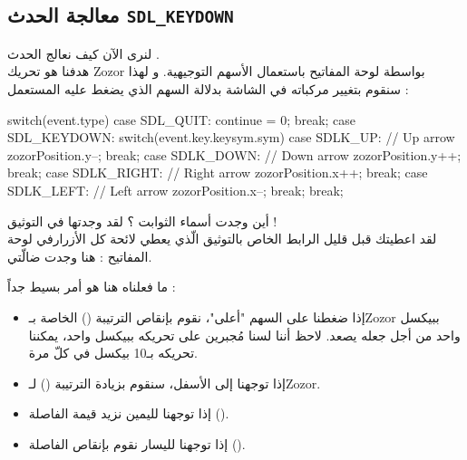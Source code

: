 \subsection{معالجة الحدث \texttt{SDL\_KEYDOWN}}

لنرى الآن كيف نعالج الحدث 
.\\
هدفنا هو تحريك 
\textenglish{Zozor}
بواسطة لوحة المفاتيح باستعمال الأسهم التوجيهية. و لهذا سنقوم بتغيير مركباته في الشاشة بدلالة السهم الذي يضغط عليه المستعمل :

\begin{Csource}
switch(event.type)
{
	case SDL_QUIT:
	continue = 0;
	break;
	case SDL_KEYDOWN:
	switch(event.key.keysym.sym)
	{
		case SDLK_UP: // Up arrow
		zozorPosition.y--;
		break;
		case SDLK_DOWN: // Down arrow
		zozorPosition.y++;
		break;
		case SDLK_RIGHT: // Right arrow
		zozorPosition.x++;
		break;
		case SDLK_LEFT: // Left arrow
		zozorPosition.x--;
		break;
	}
	break;
}
\end{Csource}

أين وجدت أسماء الثوابت ؟  لقد وجدتها في التوثيق !\\
لقد اعطيتك قبل قليل الرابط الخاص بالتوثيق الّذي يعطي لائحة كل الأزرارفي لوحة المفاتيح : هنا وجدت ضالّتي. 

ما فعلناه هنا هو أمر بسيط جداً :

\begin{itemize}
	\item إذا ضغطنا على السهم "أعلى"، نقوم بإنقاص الترتيبة 
	()
	الخاصة بـ\textenglish{Zozor}
	ببيكسل واحد من أجل جعله يصعد. لاحظ أننا لسنا مُجبرين على تحريكه ببيكسل واحد، يمكننا تحريكه بـ10 بيكسل في كلّ مرة.
	\item إذا توجهنا إلى الأسفل، سنقوم بزيادة الترتيبة
	()
	لـ\textenglish{Zozor}.
	\item إذا توجهنا لليمين نزيد قيمة الفاصلة 
	().
	\item إذا توجهنا لليسار نقوم بإنقاص الفاصلة  
	().
\end{itemize}

